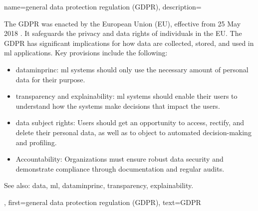 {name={general data protection regulation (GDPR)},
	description={The GDPR
			was enacted by the European Union (EU), effective from 25 May 2018 \cite{GDPR2016}. 
			It safeguards the privacy and \gls{data} rights of individuals in the EU. 
			The GDPR has significant implications for how \gls{data} are collected, stored, and used in \gls{ml}  
			applications. Key provisions include the following:
			\begin{itemize}
				\item \Gls{dataminprinc}: \gls{ml} systems should only use the necessary amount of personal 
				\gls{data} for their purpose.
				\item \Gls{transparency} and \gls{explainability}: \gls{ml} systems should enable their users to 
				understand how the systems make decisions that impact the users.
				\item \Gls{data} subject rights: Users should get an opportunity to access, rectify, and delete their personal \gls{data}, as well as to object to automated decision-making and profiling.
				\item Accountability: Organizations must ensure robust \gls{data} security and demonstrate 
				compliance through documentation and regular audits.
			\end{itemize}
		See also: \gls{data}, \gls{ml}, \gls{dataminprinc}, \gls{transparency}, \gls{explainability}.}, 
	first={general data protection regulation (GDPR)},
	text={GDPR}
}
	
